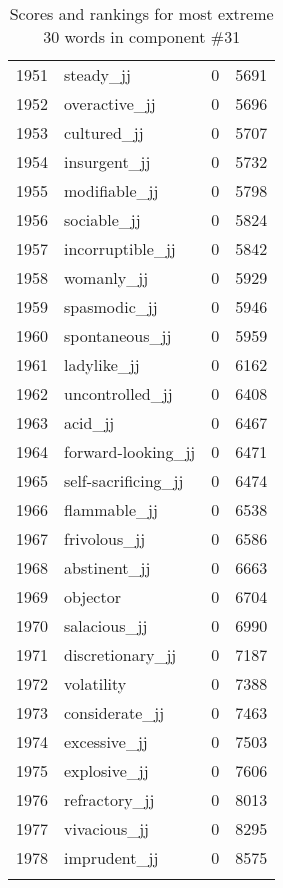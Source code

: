 \begin{longtable}[!htbp]{| rlr@{.}l |}
    1951 & steady\_jj & 0 & 5691 \\
    1952 & overactive\_jj & 0 & 5696 \\
    1953 & cultured\_jj & 0 & 5707 \\
    1954 & insurgent\_jj & 0 & 5732 \\
    1955 & modifiable\_jj & 0 & 5798 \\
    1956 & sociable\_jj & 0 & 5824 \\
    1957 & incorruptible\_jj & 0 & 5842 \\
    1958 & womanly\_jj & 0 & 5929 \\
    1959 & spasmodic\_jj & 0 & 5946 \\
    1960 & spontaneous\_jj & 0 & 5959 \\
    1961 & ladylike\_jj & 0 & 6162 \\
    1962 & uncontrolled\_jj & 0 & 6408 \\
    1963 & acid\_jj & 0 & 6467 \\
    1964 & forward-looking\_jj & 0 & 6471 \\
    1965 & self-sacrificing\_jj & 0 & 6474 \\
    1966 & flammable\_jj & 0 & 6538 \\
    1967 & frivolous\_jj & 0 & 6586 \\
    1968 & abstinent\_jj & 0 & 6663 \\
    1969 & objector & 0 & 6704 \\
    1970 & salacious\_jj & 0 & 6990 \\
    1971 & discretionary\_jj & 0 & 7187 \\
    1972 & volatility & 0 & 7388 \\
    1973 & considerate\_jj & 0 & 7463 \\
    1974 & excessive\_jj & 0 & 7503 \\
    1975 & explosive\_jj & 0 & 7606 \\
    1976 & refractory\_jj & 0 & 8013 \\
    1977 & vivacious\_jj & 0 & 8295 \\
    1978 & imprudent\_jj & 0 & 8575 \\
    \hline
    \caption{Scores and rankings for most extreme 30 words in component \#31} \\
\end{longtable}
